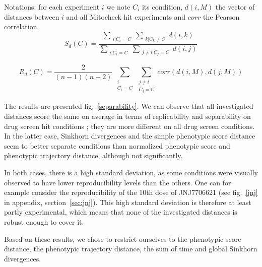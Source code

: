 Notations: for each experiment $i$ we note $C_i$ its condition,
$d(i,M)$ the vector of distances between $i$ and all Mitocheck hit
experiments and $corr$ the Pearson correlation. 
\begin{equation}
S_d(C)=\dfrac{\sum_{\substack{i|C_i= C}} \sum_{\substack{k|C_k\neq C}} d(i,k)}{\sum_{\substack{i|C_i= C}} \sum_{\substack{j\neq i| C_j = C}} d(i,j)}
\label{sepa}
\end{equation}

\begin{equation}
R_d(C)=\dfrac{2}{(n-1)(n-2)}~ \sum_{\substack{i\\C_i= C}} \sum_{\substack{j\neq i\\ C_j = C}} corr(d(i,M), d(j,M))
\label{replica}
\end{equation}

The results are presented fig.~\ref{separability}. We can observe that all investigated distances score the same on average in terms of replicability and separability on drug screen hit conditions ; they are more different on all drug screen conditions. In the latter case, Sinkhorn divergences and the simple phenotypic score distance seem to better separate conditions than normalized phenotypic score and phenotypic trajectory distance, although not significantly. 

In both cases, there is a high standard deviation, as some conditions were visually observed to have lower reproducibility levels than the others. One can for example consider the reproducibility of the 10th dose of JNJ7706621 (see fig.~\ref{jnj} in appendix, section~\ref{sec:jnj}). This high standard deviation is therefore at least partly experimental, which means that none of the investigated distances is robust enough to cover it.

Based on these results, we chose to restrict ourselves to the
phenotypic score distance, the phenotypic trajectory distance, the sum
of time and global Sinkhorn divergences. 



